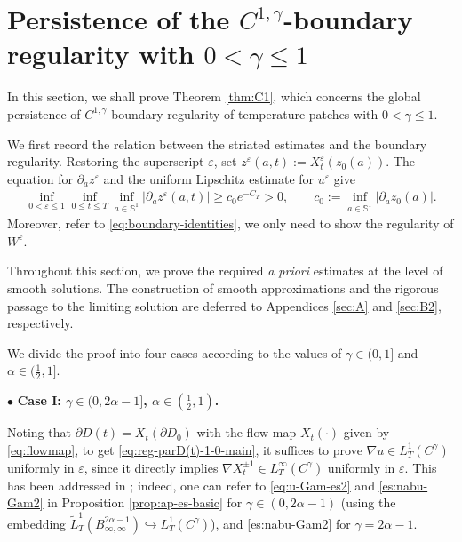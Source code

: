 \documentclass[reqno,11pt,a4paper]{amsart}
\begin{document}
\section{Persistence of the \texorpdfstring{$C^{1,\gamma}$}{C(1,gamma)}-boundary regularity with \texorpdfstring{$0<\gamma\leq1$}{0 < gamma <= 1}}\label{sec:C1}
In this section, we shall prove Theorem \ref{thm:C1}, 
which concerns the global persistence of $C^{1,\gamma}$-boundary regularity of temperature patches with $0<\gamma\leq 1$. 

We first record the relation between the striated estimates and the
boundary regularity. Restoring the superscript $\varepsilon$, set
$z^\varepsilon(a,t):=X_t^\varepsilon(z_0(a))$. The equation
for $\partial_{a }z^\varepsilon$ and the uniform Lipschitz estimate
for $u^\varepsilon$ give
\begin{align}\label{es:inf-dz}
\inf_{0<\varepsilon\leq1}
\inf_{0\leq t\leq T}
\inf_{a\in\mathbb S^1}
|\partial_{a}z^\varepsilon(a,t)|
\geq
c_0e^{-C_T}>0,
\qquad
c_0:=
\inf_{a\in\mathbb S^1}
|\partial_{a}z_0(a)|.
\end{align}
Moreover, refer to \eqref{eq:boundary-identities}, we only need to show the regularity of $W^\varepsilon$.

Throughout this section, we prove the required {\it{{\it{a priori}}}} estimates at the level of smooth solutions. The construction of smooth approximations and the rigorous passage to the limiting solution are deferred to Appendices \ref{sec:A} and \ref{sec:B2}, respectively.

We divide the proof into four cases according to the values of $\gamma\in (0,1]$ 
and $\alpha\in (\frac{1}{2},1]$.
\vskip1mm

$\bullet$ \textbf{Case I: $\gamma\in(0,2\alpha-1]$, $\alpha\in (\frac{1}{2},1)$.}
\vskip1mm

Noting that $\partial D(t) = X_t(\partial D_0)$ with the flow map $X_t(\cdot)$ given by \eqref{eq:flowmap},
to get \eqref{eq:reg-parD(t)-1-0-main}, it suffices to prove $\nabla u \in L^1_T(C^\gamma)$ uniformly in $\varepsilon$,
since it directly implies $\nabla X_t^{\pm 1}\in L^\infty_T(C^\gamma)$ uniformly in $\varepsilon$. 
This has been addressed in \cite{LXY25}; indeed, one can refer to \eqref{eq:u-Gam-es2} and \eqref{es:nabu-Gam2} 
in Proposition \ref{prop:ap-es-basic} for $\gamma\in(0,2\alpha-1)$ (using the embedding 
$\widetilde{L}^1_T(B^{2\alpha-1}_{\infty,\infty})\hookrightarrow L^1_T(C^\gamma)$), 
and \eqref{es:nabu-Gam2} for $\gamma=2\alpha-1$.
\vskip1mm
\end{document}
